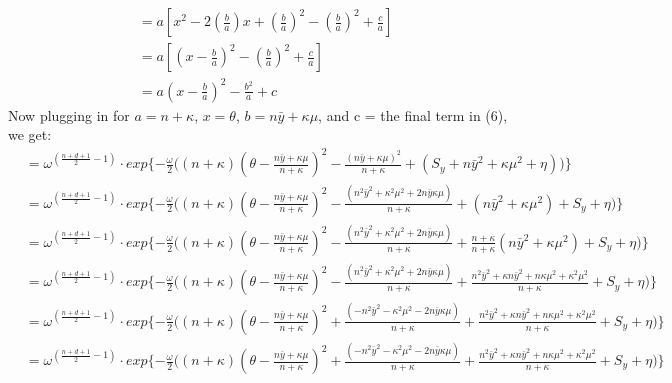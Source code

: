 \documentclass{homework}
\begin{document}
\begin{enumerate}[label=(\Alph*)]
\begin{equation}
\begin{split}
& =  a [ x^2 - 2(\frac{b}{a})x + (\frac{b}{a})^2 - (\frac{b}{a})^2 + \frac{c}{a} ] \\
& =  a [ ( x - \frac{b}{a})^2 - (\frac{b}{a})^2  + \frac{c}{a} ] \\
& =  a( x - \frac{b}{a})^2 - \frac{b^2}{a} + c
\end{split} \end{equation}
Now plugging in for $a = n + \kappa$, $x = \theta$, $b = n\bar{y} + \kappa\mu$, and c = the final term in (6), we get: \\
\begin{equation} \begin{split}
& = \omega^{( \frac{n + d + 1}{2} - 1)} \cdot exp\{ -\frac{\omega}{2}  \big( (n + \kappa)( \theta - \frac{n\bar{y} + \kappa\mu}{n + \kappa})^2 - \frac{(n\bar{y} + \kappa\mu)^2}{n + \kappa} + ( S_y + n\bar{y}^2 + \kappa\mu^2 + \eta) \big) \}\\
& = \omega^{( \frac{n + d + 1}{2} - 1)} \cdot exp\{ -\frac{\omega}{2}  \big( (n + \kappa)( \theta - \frac{n\bar{y} + \kappa\mu}{n + \kappa})^2 - \frac{(n^2\bar{y}^2 + \kappa^2\mu^2 + 2n\bar{y}\kappa\mu)}{n + \kappa} + (n\bar{y}^2 + \kappa\mu^2) +  S_y + \eta \big) \}\\
& = \omega^{( \frac{n + d + 1}{2} - 1)} \cdot exp\{ -\frac{\omega}{2}  \big( (n + \kappa)( \theta - \frac{n\bar{y} + \kappa\mu}{n + \kappa})^2 - \frac{(n^2\bar{y}^2 + \kappa^2\mu^2 + 2n\bar{y}\kappa\mu)}{n + \kappa} + \frac{n+\kappa}{n+\kappa}(n\bar{y}^2 + \kappa\mu^2) +  S_y + \eta \big) \}\\
& = \omega^{( \frac{n + d + 1}{2} - 1)} \cdot exp\{ -\frac{\omega}{2}  \big( (n + \kappa)( \theta - \frac{n\bar{y} + \kappa\mu}{n + \kappa})^2 - \frac{(n^2\bar{y}^2 + \kappa^2\mu^2 + 2n\bar{y}\kappa\mu)}{n + \kappa} + \frac{n^2\bar{y}^2 + \kappa n\bar{y}^2 + n\kappa\mu^2+ \kappa^2\mu^2}{n+\kappa} +  S_y + \eta \big) \}\\
& = \omega^{( \frac{n + d + 1}{2} - 1)} \cdot exp\{ -\frac{\omega}{2}  \big( (n + \kappa)( \theta - \frac{n\bar{y} + \kappa\mu}{n + \kappa})^2 + \frac{(-n^2\bar{y}^2 - \kappa^2\mu^2 - 2n\bar{y}\kappa\mu)}{n + \kappa} + \frac{n^2\bar{y}^2 + \kappa n\bar{y}^2 + n\kappa\mu^2+ \kappa^2\mu^2}{n+\kappa} +  S_y + \eta \big) \}\\
& = \omega^{( \frac{n + d + 1}{2} - 1)} \cdot exp\{ -\frac{\omega}{2}  \big( (n + \kappa)( \theta - \frac{n\bar{y} + \kappa\mu}{n + \kappa})^2 + \frac{(-n^2\bar{y}^2 - \kappa^2\mu^2 - 2n\bar{y}\kappa\mu)}{n + \kappa} + \frac{n^2\bar{y}^2 + \kappa n\bar{y}^2 + n\kappa\mu^2+ \kappa^2\mu^2}{n+\kappa} +  S_y + \eta \big) \}\\

\end{split}
\end{equation}
\end{enumerate}
\end{document}
